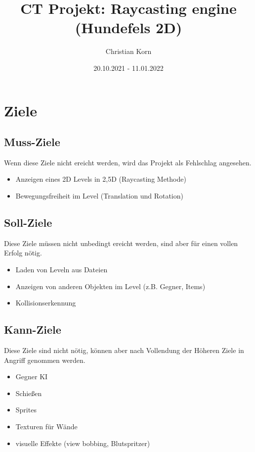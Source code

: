 \documentclass[a4paper]{article}
\title{CT Projekt: Raycasting engine (Hundefels 2D)}
\author{Christian Korn}
\date{20.10.2021 - 11.01.2022}
\begin{document}
	
\maketitle

\newpage

\tableofcontents

\newpage

\section{Ziele}

\subsection{Muss-Ziele}
Wenn diese Ziele nicht ereicht werden, wird das Projekt als Fehlschlag angesehen.

\begin{itemize}
\item Anzeigen eines 2D Levels in 2,5D (Raycasting Methode)
\item Bewegungsfreiheit im Level (Translation und Rotation)
\end{itemize}

\subsection{Soll-Ziele}
Diese Ziele müssen nicht unbedingt ereicht werden, sind aber für einen vollen Erfolg nötig.

\begin{itemize}
\item Laden von Leveln aus Dateien
\item Anzeigen von anderen Objekten im Level (z.B. Gegner, Items)
\item Kollisionserkennung
\end{itemize}

\subsection{Kann-Ziele}
Diese Ziele sind nicht nötig, können aber nach Vollendung der Höheren Ziele in Angriff genommen werden.


\begin{itemize}
\item Gegner KI
\item Schießen
\item Sprites
\item Texturen für Wände
\item visuelle Effekte (view bobbing, Blutspritzer)
\end{itemize}
\end{document}
